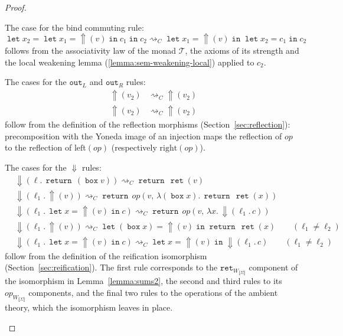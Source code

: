 \documentclass[acmsmall, screen, review, anonymous]{acmart}
\theoremstyle{definition}
\newcommand{\sem}[1]{\llbracket #1 \rrbracket}
\newcommand{\reflectname}{\mathord{\Uparrow}}
\newcommand{\performraw}[2]{\mathop{\reflectname(#1(#2))}}
\newcommand{\perform}[3]{\performraw{#1}{#2}(#3)}
\newcommand{\reifyname}{\Downarrow}
\newcommand{\reify}[2]{\mathop{\reifyname}(#1.\,#2)}
\newcommand{\reifyc}[2]{\mathop{\reifyname_{#1 #2}}}
\newcommand{\loc}{\ell}
\newcommand{\outlname}{\mathtt{out}_L}
\newcommand{\outl}[1]{\mathop{\outlname} #1}
\newcommand{\outrname}{\mathtt{out}_R}
\newcommand{\outr}[1]{\mathop{\outrname} #1}
\newcommand{\mon}{\mathcal{T}}
\newcommand{\ind}[1]{W_{#1}}
\newcommand{\indintro}[3]{{#1}(#2,\, #3)}
\newcommand{\retname}{\mathtt{ret}}
\newcommand{\ret}[1]{\mathop{\retname}(#1)}
\newcommand{\retcw}[1]{\retname_{\ind{#1}}}
\newcommand{\opcw}[2]{{#1}_{\ind{#2}}}
\newcommand{\abs}[2]{\lambda#1.\,#2}
\newcommand{\returnname}{\mathop{\mathtt{return}}}
\newcommand{\return}[1]{\returnname\, #1}
\newcommand{\letvname}{\mathop{\mathtt{let}}}
\newcommand{\letv}[3]{\letvname #1 = #2 \mathop{\mathtt{in}} #3}
\newcommand{\gboxname}{\mathop{\mathtt{box}}}
\newcommand{\gbox}[1]{\gboxname #1}
\newcommand{\stepstoname}{\rightsquigarrow}
\newcommand{\stepstoc}{\stepstoname_C}
\begin{document}
\begin{proof}
\begin{description}
    The case for the bind commuting rule: 
    \begin{equation*}
      \letv{x_2}{\letv{x_1}{\perform{\loc}{op}{v}}{c_1}}{c_2} \stepstoc \letv{x_1}{\perform{\loc}{op}{v}}{\letv{x_2}{c_1}{c_2}}
    \end{equation*}
    follows from the associativity law of the monad $\mon$, the axioms
    of its strength and the local weakening lemma
    (\ref{lemma:sem-weakening-local}) applied to $c_2$.

  \item[Reflection]

    The cases for the $\outlname$ and $\outrname$ rules:
    \begin{align*}
      \perform{(\outl{v_1})}{op}{v_2} &\stepstoc \perform{v_1}{\mathrm{left}(op)}{v_2} \\
      \perform{(\outr{v_1})}{op}{v_2} &\stepstoc \perform{v_1}{\mathrm{right}(op)}{v_2}
    \end{align*}
    follow from the definition of the reflection morphisms
    (Section~\ref{sec:reflection}): precomposition with the Yoneda image
    of an injection maps the reflection of $op$ to the reflection of
    $\mathrm{left}(op)$ (respectively $\mathrm{right}(op)$).

  \item[Reification]

    The cases for the $\reifyname$ rules:
    \begin{align*}
      &\reify{\loc}{\return{(\gbox{v})}} \stepstoc \return{\ret{v}} \\
      &\reify{\loc_1}{\perform{\loc_1}{op}{v}} \stepstoc \return{\indintro{op}{v}{\abs{(\gbox{x})}{\return{\ret{x}}}}} \\
      &\reify{\loc_1}{\letv{x}{\perform{\loc_1}{op}{v}}{c}} \stepstoc \return{\indintro{op}{v}{\abs{x}{\reify{\loc_1}{c}}}} \\
      &\reify{\loc_1}{\perform{\loc_2}{op}{v}} \stepstoc \letv{(\gbox{x})}{\perform{\loc_2}{op}{v}}{\return{\ret{x}}} \qquad (\loc_1 \neq \loc_2) \\
      &\reify{\loc_1}{\letv{x}{\perform{\loc_2}{op}{v}}{c}} \stepstoc \letv{x}{\perform{\loc_2}{op}{v}}{\reify{\loc_1}{c}} \qquad (\loc_1 \neq \loc_2)
    \end{align*}
    follow from the definition of the reification isomorphism
    $\reifyc{\Sigma}{}$ (Section~\ref{sec:reification}). The first rule
    corresponds to the $\retcw{\sem{\Sigma}}$ component of the
    isomorphism in Lemma~\ref{lemma:sums2}, the second and third rules
    to its $\opcw{op}{\sem{\Sigma}}$ components, and the final two rules
    to the operations of the ambient theory, which the isomorphism
    leaves in place.

\end{description}
\end{proof}
\end{document}
